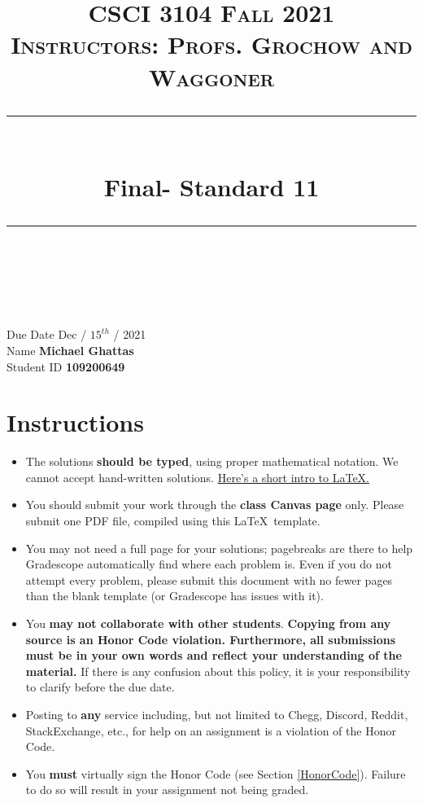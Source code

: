 \documentclass[11pt]{article}
\title{
\normalfont \normalsize 
\textsc{CSCI 3104 Fall 2021 \\ 
Instructors: Profs. Grochow and Waggoner} \\
[10pt] 
\rule{\linewidth}{0.5pt} \\[6pt] 
\huge Final- Standard 11 \\
\rule{\linewidth}{2pt}  \\[10pt]
}
\date{}
\theoremstyle{definition}
\theoremstyle{definition}
\theoremstyle{definition}
\begin{document}

\maketitle


\noindent
Due Date \dotfill Dec / $15^{th}$ / 2021 \\
Name \dotfill \textbf{Michael Ghattas} \\
Student ID \dotfill \textbf{109200649} \\


\tableofcontents

\section{Instructions}
 \begin{itemize}
	\item The solutions \textbf{should be typed}, using proper mathematical notation. We cannot accept hand-written solutions. \href{http://ece.uprm.edu/~caceros/latex/introduction.pdf}{Here's a short intro to \LaTeX.}
	\item You should submit your work through the \textbf{class Canvas page} only. Please submit one PDF file, compiled using this \LaTeX \ template.
	\item You may not need a full page for your solutions; pagebreaks are there to help Gradescope automatically find where each problem is. Even if you do not attempt every problem, please submit this document with no fewer pages than the blank template (or Gradescope has issues with it).

	\item You \textbf{may not collaborate with other students}. \textbf{Copying from any source is an Honor Code violation. Furthermore, all submissions must be in your own words and reflect your understanding of the material.} If there is any confusion about this policy, it is your responsibility to clarify before the due date. 

	\item Posting to \textbf{any} service including, but not limited to Chegg, Discord, Reddit, StackExchange, etc., for help on an assignment is a violation of the Honor Code.

	\item You \textbf{must} virtually sign the Honor Code (see Section \ref{HonorCode}). Failure to do so will result in your assignment not being graded.
\end{itemize}
\end{document}

